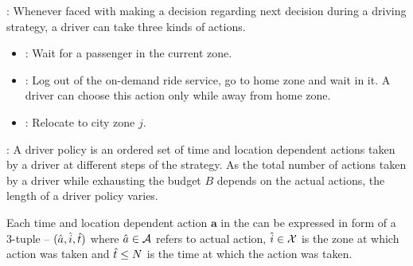 
: 
Whenever faced with making a decision regarding next decision during a driving strategy, a driver can take three kinds
of actions.

\begin{itemize}
	\item {\getpassenger} \getpassengeraction: Wait for a passenger in the current zone. 
	\item {\gohome} \gohomeaction: Log out of the on-demand ride service, go to home zone and wait in it. A driver can
	choose this action only while away from home zone.
	\item {\relocate} \relocateaction: Relocate to city zone $j$.
\end{itemize}


:
A driver policy is an ordered set of time and location dependent actions taken by a driver at different steps of the strategy. As the total number of actions taken by a driver while exhausting the budget $B$ depends on the actual actions, the length
of a driver policy {\policy} varies. 

Each time and location dependent action $\mathbf{a}$ in the {\policy} can be expressed in form of a 3-tuple -- $(\hat{a}, \hat{i}, \hat{t})$
where $\hat{a} \in \mathcal{A}$ refers to actual action, $\hat{i} \in \mathcal{X}$ is the zone at which action was taken and $\hat{t} \leq N$ is the 
time at which the action was taken.



